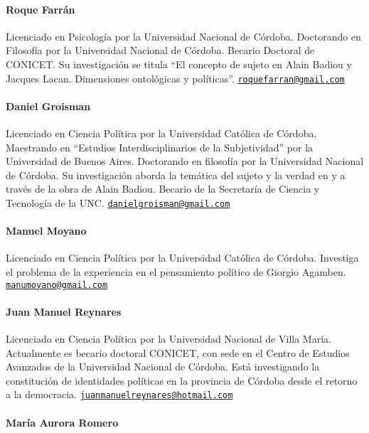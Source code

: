\paragraph{Roque Farrán}


Licenciado en Psicología por la Universidad Nacional de Córdoba. Doctorando en Filosofía por la Universidad Nacional de Córdoba. Becario Doctoral de CONICET. Su investigación se titula \enquote{El concepto de sujeto en Alain Badiou y Jacques Lacan. Dimensiones ontológicas y políticas}.  \href{mailto:roquefarran@gmail.com}{\texttt{roquefarran@gmail.com}}


\paragraph{Daniel Groisman}


Licenciado en Ciencia Política por la Universidad Católica de Córdoba. Maestrando en \enquote{Estudios Interdisciplinarios de la Subjetividad} por la Universidad de Buenos Aires. Doctorando en filosofía por la Universidad Nacional de Córdoba. Su investigación aborda la temática del sujeto y la verdad en y a través de la obra de Alain Badiou. Becario de la Secretaría de Ciencia y Tecnología de la UNC.  \href{mailto:danielgroisman@gmail.com}{\texttt{danielgroisman@gmail.com}}


\paragraph{Manuel Moyano}


Licenciado en Ciencia Política por la Universidad Católica de Córdoba. Investiga el problema de la experiencia en el pensamiento político de Giorgio Agamben.   \href{mailto:manumoyano@gmail.com}{\texttt{manumoyano@gmail.com}}


\paragraph{Juan Manuel Reynares}


Licenciado en Ciencia Política por la Universidad Nacional de Villa María. Actualmente es becario doctoral CONICET, con sede en el Centro de Estudios Avanzados de la Universidad Nacional de Córdoba. Está investigando la constitución de identidades políticas en la provincia de Córdoba desde el retorno a la democracia.
\href{mailto:juanmanuelreynares@hotmail.com}{\texttt{juanmanuelreynares@hotmail.com}}

\paragraph{María Aurora Romero}


